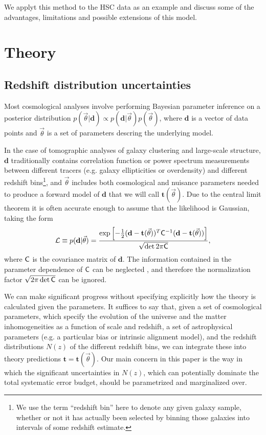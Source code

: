 \documentclass[a4paper,11pt]{article}
\newcommand{\vd}{\mathbf{d}}
\newcommand{\vt}{\mathbf{t}}
\begin{document}
    We applyt this method to the HSC data as an example and  discuss some of the advantages, limitations and possible extensions of this model. 

  \section{Theory}\label{sec:theory}
    \subsection{Redshift distribution uncertainties}\label{ssec:theory.nz}
      Most cosmological analyses involve performing Bayesian parameter inference on a posterior distribution $p(\vec{\theta} |\vd) \propto p(\vd|\vec{\theta}) p(\vec{\theta})$, where $\vd$ is a vector of data points and $\vec{\theta}$ is a set of parameters descring the underlying model.
      
      In the case of tomographic analyses of galaxy clustering and large-scale structure, $\vd$ traditionally contains correlation function or power spectrum measurements between different tracers (e.g. galaxy ellipticities or overdensity) and different redshift bins\footnote{We use the term ``redshift bin'' here to denote any given galaxy sample, whether or not it has actually been selected by binning those galaxies into intervals of some redshift estimate.}, and $\vec{\theta}$ includes both cosmological and nuisance parameters needed to produce a forward model of $\vd$ that we will call $\vt(\vec{\theta})$. Due to the central limit theorem it is often accurate enough to assume that the likelihood is Gaussian, taking the form
      \begin{equation}
        \mathcal{L} \equiv p({\bf d}|\vec{\theta}) = \frac{\exp\left [-\frac{1}{2}(\vd-\vt(\vec{\theta}))^T{\sf C}^{-1}(\vd-\vt(\vec{\theta})) \right]}{\sqrt{\det{2\pi{\sf C}}}}, \label{eq:like}
     \end{equation}
      where ${\sf C}$ is the covariance matrix of $\vd$. The information contained in the parameter dependence of ${\sf C}$ can be neglected \citep{1811.11584}, and therefore the normalization factor $\sqrt{2\pi\det{\sf C}}$ can be ignored.

      We can make significant progress without specifying explicitly how the theory is calculated given the parameters. It suffices to say that, given a set of cosmological parameters, which specify the evolution of the universe and the matter inhomogeneities as a function of scale and redshift, a set of astrophysical parameters (e.g. a particular bias or intrinsic alignment model), and the redshift distributions $N(z)$ of the different redshift bins, we can integrate these into theory predictions $\vt=\vt(\vec{\theta})$. Our main concern in this paper is the way in which the significant uncertainties in $N(z)$, which can potentially dominate the total systematic error budget, should be parametrized and marginalized over.
\end{document}
